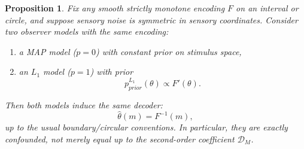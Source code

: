 \documentclass[11pt]{article}
\newtheorem{proposition}{Proposition}
\newcommand{\Prior}{p_{prior}}
\begin{document}
\begin{proposition}
Fix any smooth strictly monotone encoding $F$ on an interval or circle, and suppose sensory noise is symmetric in sensory coordinates. Consider two observer models with the same encoding:
\begin{enumerate}
\item a MAP model ($p=0$) with constant prior on stimulus space,
\item an $L_1$ model ($p=1$) with prior
\[
\Prior^{L_1}(\theta)\propto F'(\theta).
\]
\end{enumerate}
Then both models induce the same decoder:
\[
\widehat\theta(m)=F^{-1}(m),
\]
up to the usual boundary/circular conventions. In particular, they are exactly confounded, not merely equal up to the second-order coefficient $\mathcal{D}_M$.
\end{proposition}
\end{document}
